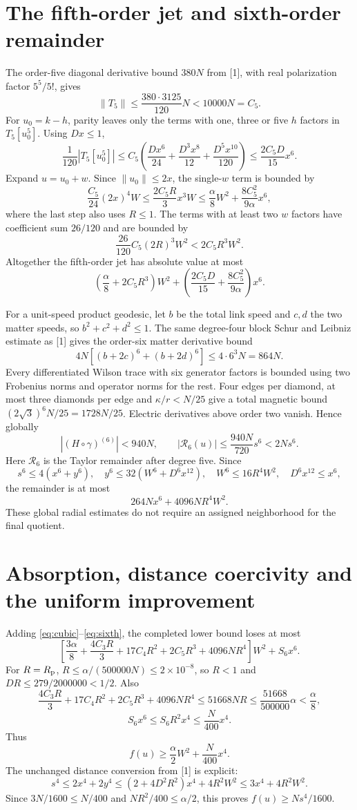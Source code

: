 \documentclass[11pt,a4paper]{article}
\begin{document}
\section{The fifth-order jet and sixth-order remainder}
The order-five diagonal derivative bound $380N$ from [1], with real polarization factor $5^5/5!$, gives
\[
\|T_5\|\le\frac{380\cdot3125}{120}N<10000N=C_5.
\]
For $u_0=k-h$, parity leaves only the terms with one, three or five $h$ factors in $T_5[u_0^5]$. Using $Dx\le1$,
\[
\frac1{120}|T_5[u_0^5]|
\le C_5\left(\frac{Dx^6}{24}+\frac{D^3x^8}{12}+\frac{D^5x^{10}}{120}\right)
\le\frac{2C_5D}{15}x^6.
\]
Expand $u=u_0+w$. Since $\|u_0\|\le2x$, the single-$w$ term is bounded by
\[
\frac{C_5}{24}(2x)^4W\le\frac{2C_5R}{3}x^3W
\le\frac\alpha8W^2+\frac{8C_5^2}{9\alpha}x^6,
\]
where the last step also uses $R\le1$. The terms with at least two $w$ factors have coefficient sum $26/120$ and are bounded by
\[
\frac{26}{120}C_5(2R)^3W^2<2C_5R^3W^2.
\]
Altogether the fifth-order jet has absolute value at most
\begin{equation}\label{eq:fifth}
\left(\frac\alpha8+2C_5R^3\right)W^2
+\left(\frac{2C_5D}{15}+\frac{8C_5^2}{9\alpha}\right)x^6.
\end{equation}

For a unit-speed product geodesic, let $b$ be the total link speed and $c,d$ the two matter speeds, so $b^2+c^2+d^2\le1$. The same degree-four block Schur and Leibniz estimate as [1] gives the order-six matter derivative bound
\[
4N[(b+2c)^6+(b+2d)^6]\le4\cdot6^3N=864N.
\]
Every differentiated Wilson trace with six generator factors is bounded using two Frobenius norms and operator norms for the rest. Four edges per diamond, at most three diamonds per edge and $\kappa/r<N/25$ give a total magnetic bound $(2\sqrt3)^6N/25=1728N/25$. Electric derivatives above order two vanish. Hence globally
\[
|(H\circ\gamma)^{(6)}|<940N,\qquad
|\mathcal R_6(u)|\le\frac{940N}{720}s^6<2Ns^6.
\]
Here $\mathcal R_6$ is the Taylor remainder after degree five. Since
\[
s^6\le4(x^6+y^6),\quad y^6\le32(W^6+D^6x^{12}),\quad
W^6\le16R^4W^2,\quad D^6x^{12}\le x^6,
\]
the remainder is at most
\begin{equation}\label{eq:sixth}
264N x^6+4096NR^4W^2.
\end{equation}
These global radial estimates do not require an assigned neighborhood for the final quotient.
\newpage
\section{Absorption, distance coercivity and the uniform improvement}
Adding \eqref{eq:cubic}--\eqref{eq:sixth}, the completed lower bound loses at most
\[
\left[\frac{3\alpha}{8}+\frac{4C_3R}{3}+17C_4R^2+2C_5R^3+4096NR^4\right]W^2
+S_6x^6.
\]
For $R=R_{\rm p}$, $R\le\alpha/(500000N)\le2\times10^{-8}$, so $R<1$ and $DR\le279/2000000<1/2$. Also
\[
\frac{4C_3R}{3}+17C_4R^2+2C_5R^3+4096NR^4
\le51668NR\le\frac{51668}{500000}\alpha<\frac\alpha8,
\]
\[
S_6x^6\le S_6R^2x^4\le\frac{N}{400}x^4.
\]
Thus
\[
f(u)\ge\frac\alpha2W^2+\frac{N}{400}x^4.
\]
The unchanged distance conversion from [1] is explicit:
\[
s^4\le2x^4+2y^4\le(2+4D^2R^2)x^4+4R^2W^2
\le3x^4+4R^2W^2.
\]
Since $3N/1600\le N/400$ and $NR^2/400\le\alpha/2$, this proves $f(u)\ge Ns^4/1600$.
\end{document}
